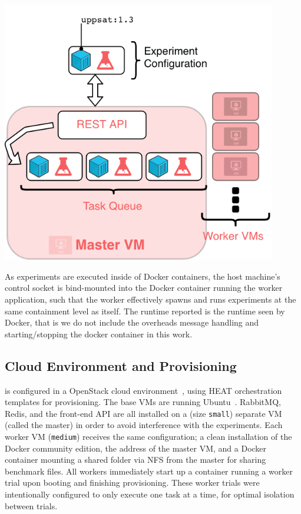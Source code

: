 \documentclass[a4paper]{IEEEtran}
\begin{document}
\begin{Figure}
  \centering
  \includegraphics[width=0.9\textwidth]{architecture}
  \label{fig:architecture}
\end{Figure}

As experiments are executed inside of Docker containers, the host
machine's control socket is bind-mounted into the Docker container
running the worker application, such that the worker effectively
spawns and runs experiments at the same containment level as
itself. The runtime reported is the runtime seen by Docker, that is we
do not include the overheads message handling and starting/stopping
the docker container in this work.

\subsection{Cloud Environment and Provisioning}

\testbench{} is configured in a OpenStack cloud environment~\cite{openstack},
using HEAT orchestration templates for provisioning. The base VMs are running
Ubuntu~. RabbitMQ, Redis, and the front-end API are all installed
on a (size \texttt{small}) separate VM (called the master) in order to avoid
interference with the experiments. Each worker VM (\texttt{medium}) receives the
same configuration; a clean installation of the Docker community edition, the
address of the master VM, and a Docker container mounting a shared folder via
NFS from the master for sharing benchmark files. All workers immediately start
up a container running a worker trial upon booting and finishing
provisioning. These worker trials were intentionally configured to only
execute one task at a time, for optimal isolation between trials.
\end{document}
